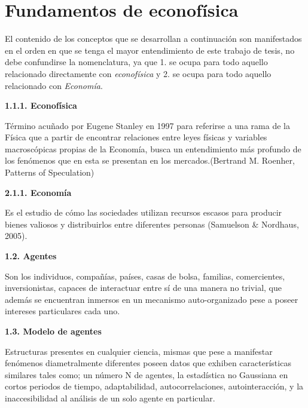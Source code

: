 %
\chapter{Fundamentos de econofísica}
\label{sec:related}



El contenido de los conceptos que se desarrollan a continuación son manifestados en el orden en que se tenga el mayor entendimiento de este trabajo de tesis, no debe confundirse la nomenclatura, ya que 1. se ocupa para todo aquello relacionado directamente con \textit{econofísica} y 2. se ocupa para todo aquello relacionado con \textit{Economía}.\newline

{
\Large \textbf{1.1.1. Econofísica}
}

Término acuñado por Eugene Stanley en 1997 para referirse a una rama de la Física que a partir de encontrar relaciones entre leyes físicas y variables macroscópicas propias de la Economía, busca un entendimiento más profundo de los fenómenos que en esta se presentan en los mercados.(Bertrand M. Roenher, Patterns of Speculation)
\newline

{
\Large  \textbf{2.1.1. Economía} 
}

Es el estudio de cómo las sociedades utilizan recursos escasos para producir bienes valiosos y distribuirlos entre diferentes personas (Samuelson \& Nordhaus, 2005).
\newline

{
\Large  \textbf{1.2. Agentes} 
}

Son los individuos, compañías, países, casas de bolsa, familias, comercientes, inversionistas, capaces de interactuar entre sí de una manera no trivial, que además se encuentran inmersos en un mecanismo auto-organizado pese a poseer intereses particulares cada uno.
\newpage

{
\Large  \textbf{1.3. Modelo de agentes} 
}

Estructuras presentes en cualquier ciencia, mismas que pese a manifestar fenómenos diametralmente diferentes poseen datos que exhiben características similares tales como; un número N de agentes, la estadística no Gaussiana en cortos periodos de tiempo, adaptabilidad, autocorrelaciones, autointeracción, y la inaccesibilidad al análisis de un solo agente en particular.
\newline

